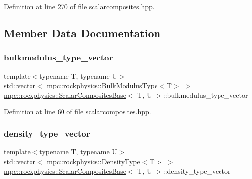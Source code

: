 Definition at line 270 of file scalarcomposites.\+hpp.



\subsection{Member Data Documentation}
\mbox{\label{classmpc_1_1rockphysics_1_1_scalar_composites_base_ade366a52f2f7d29a24d3ff200aa968f4}} 
\subsubsection{\texorpdfstring{bulkmodulus\+\_\+type\+\_\+vector}{bulkmodulus\_type\_vector}}
{\footnotesize\ttfamily template$<$typename T, typename U$>$ \\
std\+::vector$<$ \mbox{\hyperlink{structmpc_1_1rockphysics_1_1_bulk_modulus_type}{mpc\+::rockphysics\+::\+Bulk\+Modulus\+Type}}$<$T$>$ $>$ \mbox{\hyperlink{classmpc_1_1rockphysics_1_1_scalar_composites_base}{mpc\+::rockphysics\+::\+Scalar\+Composites\+Base}}$<$ T, U $>$\+::bulkmodulus\+\_\+type\+\_\+vector\hspace{0.3cm}{\ttfamily [protected]}}



Definition at line 60 of file scalarcomposites.\+hpp.

\mbox{\label{classmpc_1_1rockphysics_1_1_scalar_composites_base_a42b8687558e57e8c9e8548a7041107a9}} 
\subsubsection{\texorpdfstring{density\+\_\+type\+\_\+vector}{density\_type\_vector}}
{\footnotesize\ttfamily template$<$typename T, typename U$>$ \\
std\+::vector$<$ \mbox{\hyperlink{structmpc_1_1rockphysics_1_1_density_type}{mpc\+::rockphysics\+::\+Density\+Type}}$<$T$>$ $>$ \mbox{\hyperlink{classmpc_1_1rockphysics_1_1_scalar_composites_base}{mpc\+::rockphysics\+::\+Scalar\+Composites\+Base}}$<$ T, U $>$\+::density\+\_\+type\+\_\+vector\hspace{0.3cm}{\ttfamily [protected]}}



